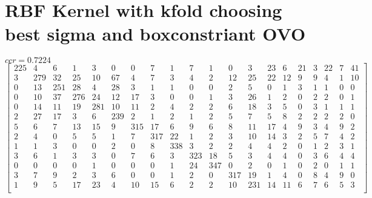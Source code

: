 \documentclass[a4paper, 11pt]{article}
\begin{document}
\section{RBF Kernel with kfold choosing best sigma and boxconstriant OVO}
$ccr=0.7224$
\[\begin{bmatrix}
   225  &   4  &   6  &   1   &  3  &   0 &    0  &   7  &   1  &   7  &   1 &    0  &   3  &  23  &   6  &  21  &   3  &  22  &   7  &  41 \\
     3  & 279  &  32  &  25   & 10  &  67 &    4  &   7  &   3  &   4  &   2 &   12  &  25  &  22  &  12  &   9  &   9  &   4  &   1  &  10 \\
     0  &  13  & 251  &  28   &  4  &  28 &    3  &   1  &   1  &   0  &   0 &    2  &   5  &   0  &   1  &   3  &   1  &   1  &   0  &   0 \\
     0  &  10  &  37  & 276   & 24  &  12 &   17  &   3  &   0  &   0  &   1 &    3  &  26  &   1  &   2  &   0  &   2  &   2  &   0  &   1 \\
     0  &  14  &  11  &  19   &281  &  10 &   11  &   2  &   4  &   2  &   2 &    6  &  18  &   3  &   5  &   0  &   3  &   1  &   1  &   1 \\
     2  &  27  &  17  &   3   &  6  & 239 &    2  &   1  &   2  &   1  &   2 &    5  &   7  &   5  &   8  &   2  &   2  &   2  &   2  &   0 \\
     5  &   6  &   7  &  13   & 15  &   9 &  315  &  17  &   6  &   9  &   6 &    8  &  11  &  17  &   4  &   9  &   3  &   4  &   9  &   2 \\
     2  &   4  &   0  &   5   &  5  &   1 &    7  & 317  &  22  &   1  &   2 &    3  &  10  &  14  &   3  &   2  &   5  &   7  &   4  &   2 \\
     1  &   1  &   3  &   0   &  0  &   2 &    0  &   8  & 338  &   3  &   2 &    2  &   4  &   4  &   2  &   0  &   1  &   2  &   3  &   1 \\
     3  &   6  &   1  &   3   &  3  &   0 &    7  &   6  &   3  & 323  &  18 &    5  &   3  &   4  &   4  &   0  &   3  &   6  &   4  &   4 \\
     0  &   0  &   0  &   0   &  1  &   0 &    0  &   0  &   1  &  24  & 347 &    0  &   2  &   0  &   1  &   0  &   2  &   0  &   1  &   1 \\
     3  &   7  &   9  &   2   &  3  &   6 &    0  &   0  &   1  &   2  &   0 &  317  &  19  &   1  &   4  &   0  &   8  &   4  &   9  &   0 \\
     1  &   9  &   5  &  17   & 23  &   4 &   10  &  15  &   6  &   2  &   2 &   10  & 231  &  14  &  11  &   6  &   7  &   6  &   5  &   3 \\

\end{bmatrix}\]
\end{document}
